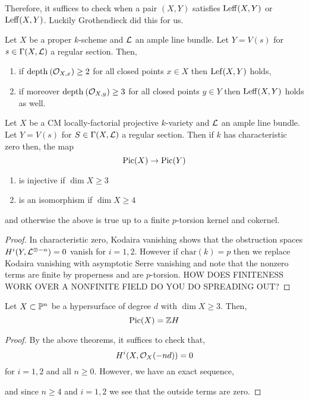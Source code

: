 \documentclass[12pt]{article}
\begin{document}
Therefore, it suffices to check when a pair $(X, Y)$ satisfies $\Leff(X,Y)$ or $\Leff(X,Y)$. Luckily Grothendieck did this for us.

\begin{theorem}
Let $X$ be a proper $k$-scheme and $\L$ an ample line bundle. Let $Y = V(s)$ for $s \in \Gamma(X, \L)$ a regular section. Then,
\begin{enumerate}
\item if $\depth{}{\stalk{X}{x}} \ge 2$ for all closed points $x \in X$ then $\Lef(X,Y)$ holds,
\item if moreover $\depth{}{\stalk{X}{y}} \ge 3$ for all closed points $y \in Y$ then $\Leff(X,Y)$ holds as well.
\end{enumerate}
\end{theorem}

\begin{cor}
Let $X$ be a CM locally-factorial projective $k$-variety and $\L$ an ample line bundle. Let $Y = V(s)$ for $S \in \Gamma(X, \L)$ a regular section. Then if $k$ has characteristic zero then, the map
\[ \Pic{X} \to \Pic{Y} \]
\begin{enumerate}
\item is injective if $\dim{X} \ge 3$
\item is an isomorphism if $\dim{X} \ge 4$
\end{enumerate}
and otherwise the above is true up to a finite $p$-torsion kernel and cokernel.
\end{cor}

\begin{proof}
In characteristic zero, Kodaira vanishing shows that the obstruction spaces $H^i(Y, \L^{\ot -n}) = 0$ vanish for $i = 1,2$. However if $\mathrm{char}(k) = p$ then we replace Kodaira vanishing with asymptotic
Serre vanishing and note that the nonzero terms are finite by properness and are $p$-torsion. {\color{red} HOW DOES FINITENESS WORK OVER A NONFINITE FIELD DO YOU DO SPREADING OUT?}
\end{proof}

\begin{cor}
Let $X \subset \P^n$ be a hypersurface of degree $d$ with $\dim{X} \ge 3$. Then,
\[ \Pic{X} = \Z H \]
\end{cor}

\begin{proof}
By the above theorems, it suffices to check that,
\[ H^i(X, \struct{X}(-nd)) = 0 \]
for $i = 1,2$ and all $n \ge 0$. However, we have an exact sequence,
\begin{center}
\end{center}
and since $n \ge 4$ and $i = 1,2$ we see that the outside terms are zero. 
\end{proof}
\end{document}
